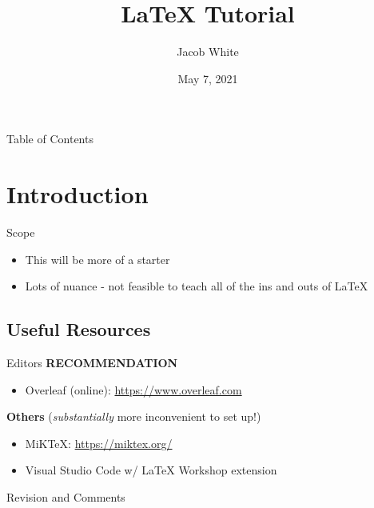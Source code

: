 \documentclass{beamer}
\title{LaTeX Tutorial}
\author{Jacob White}
\institute{Memorial University of Newfoundland}
\date{May 7, 2021}
\begin{document}
\begin{frame}
    \titlepage
\end{frame}

\begin{frame}{Table of Contents}
    \tableofcontents
\end{frame}

\section{Introduction}

\begin{frame}{Scope}
    \begin{itemize}
        \item This will be more of a starter
        \item Lots of nuance - not feasible to teach all of the ins and outs of \LaTeX
    \end{itemize}
\end{frame}

\subsection{Useful Resources}
\begin{frame}{Editors}
    \textbf{RECOMMENDATION}\\
    \begin{itemize}
        \item Overleaf (online): \url{https://www.overleaf.com}
    \end{itemize}
    
    \vspace{\baselineskip}
    
    \textbf{Others} (\textit{substantially} more inconvenient to set up!)\\
    \begin{itemize}
        \item MiKTeX: \url{https://miktex.org/}
        \item Visual Studio Code w/ LaTeX Workshop extension
    \end{itemize}
\end{frame}

\begin{frame}{Revision and Comments}

    
\end{frame}
\end{document}
